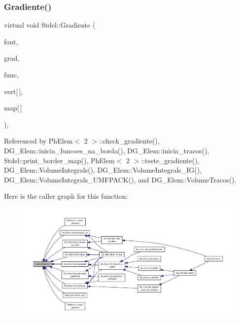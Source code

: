 \subsubsection{\texorpdfstring{Gradiente()}{Gradiente()}\hspace{0.1cm}{\footnotesize\ttfamily [4/6]}}
{\footnotesize\ttfamily virtual void Stdel\+::\+Gradiente (\begin{DoxyParamCaption}\item[{F\+I\+LE $\ast$}]{fout,  }\item[{double $\ast$$\ast$}]{grad,  }\item[{double($\ast$)(double, double, double)}]{func,  }\item[{const \hyperlink{structVertice}{Vertice}}]{vert\mbox{[}$\,$\mbox{]},  }\item[{const int}]{map\mbox{[}$\,$\mbox{]} }\end{DoxyParamCaption})\hspace{0.3cm}{\ttfamily [pure virtual]}, {\ttfamily [inherited]}}



Referenced by Ph\+Elem$<$ 2 $>$\+::check\+\_\+gradiente(), D\+G\+\_\+\+Elem\+::inicia\+\_\+funcoes\+\_\+na\+\_\+borda(), D\+G\+\_\+\+Elem\+::inicia\+\_\+tracos(), Stdel\+::print\+\_\+border\+\_\+map(), Ph\+Elem$<$ 2 $>$\+::teste\+\_\+gradiente(), D\+G\+\_\+\+Elem\+::\+Volume\+Integrals(), D\+G\+\_\+\+Elem\+::\+Volume\+Integrals\+\_\+\+I\+G(), D\+G\+\_\+\+Elem\+::\+Volume\+Integrals\+\_\+\+U\+M\+F\+P\+A\+C\+K(), and D\+G\+\_\+\+Elem\+::\+Volume\+Tracos().

Here is the caller graph for this function\+:
\nopagebreak
\begin{figure}[H]
\begin{center}
\leavevmode
\includegraphics[width=350pt]{classStdel_af3e65d1ad0d59ded925a3f5a9d0fb100_icgraph}
\end{center}
\end{figure}
\mbox{\label{classStdel_abf44e457d99e8c559c14cb1f7423da12}} 
